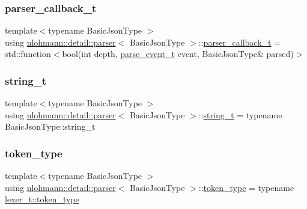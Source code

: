 \subsubsection{\texorpdfstring{parser\_callback\_t}{parser\_callback\_t}}
{\footnotesize\ttfamily template$<$typename Basic\+Json\+Type $>$ \\
using \mbox{\hyperlink{classnlohmann_1_1detail_1_1parser}{nlohmann\+::detail\+::parser}}$<$ Basic\+Json\+Type $>$\+::\mbox{\hyperlink{classnlohmann_1_1detail_1_1parser_ad250ad4f2b4af4a497e727c963162ff1}{parser\+\_\+callback\+\_\+t}} =  std\+::function$<$bool(int depth, \mbox{\hyperlink{classnlohmann_1_1detail_1_1parser_a37ac88c864dda495f72cb62776b0bebe}{parse\+\_\+event\+\_\+t}} event, Basic\+Json\+Type\& parsed)$>$}

\mbox{\label{classnlohmann_1_1detail_1_1parser_af67b9b0405262c40be2b13adaab8b046}} 
\subsubsection{\texorpdfstring{string\_t}{string\_t}}
{\footnotesize\ttfamily template$<$typename Basic\+Json\+Type $>$ \\
using \mbox{\hyperlink{classnlohmann_1_1detail_1_1parser}{nlohmann\+::detail\+::parser}}$<$ Basic\+Json\+Type $>$\+::\mbox{\hyperlink{classnlohmann_1_1detail_1_1parser_af67b9b0405262c40be2b13adaab8b046}{string\+\_\+t}} =  typename Basic\+Json\+Type\+::string\+\_\+t\hspace{0.3cm}{\ttfamily [private]}}

\mbox{\label{classnlohmann_1_1detail_1_1parser_a21d247111b332785b7acf3f8e487d117}} 
\subsubsection{\texorpdfstring{token\_type}{token\_type}}
{\footnotesize\ttfamily template$<$typename Basic\+Json\+Type $>$ \\
using \mbox{\hyperlink{classnlohmann_1_1detail_1_1parser}{nlohmann\+::detail\+::parser}}$<$ Basic\+Json\+Type $>$\+::\mbox{\hyperlink{classnlohmann_1_1detail_1_1parser_a21d247111b332785b7acf3f8e487d117}{token\+\_\+type}} =  typename \mbox{\hyperlink{classnlohmann_1_1detail_1_1lexer_a3f313cdbe187cababfc5e06f0b69b098}{lexer\+\_\+t\+::token\+\_\+type}}\hspace{0.3cm}{\ttfamily [private]}}



